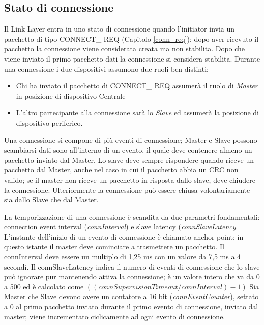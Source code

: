 \subsection{Stato di connessione}\label{connState}
Il Link Layer entra in uno stato di connessione quando l'initiator invia un pacchetto di tipo CONNECT\_ REQ (Capitolo \ref{conn_req}); dopo aver ricevuto il pacchetto la connessione viene considerata creata ma non stabilita. Dopo che viene inviato il primo pacchetto dati la connessione si considera stabilita.
Durante una connessione i due dispositivi assumono due ruoli ben distinti:
\begin{itemize}
\item Chi ha inviato il pacchetto di CONNECT\_ REQ assumerà il ruolo di \emph{Master} in posizione di dispositivo Centrale
\item L'altro partecipante alla connessione sarà lo \emph{Slave} ed assumerà la posizione di dispositivo periferico.
\end{itemize}
Una connessione si compone di più eventi di connessione; Master e Slave possono scambiarsi dati sono all'interno di un evento, il quale deve contenere almeno un pacchetto inviato dal Master. Lo slave deve sempre rispondere quando riceve un pacchetto dal Master, anche nel caso in cui il pacchetto abbia un CRC non valido; se il master non riceve un pacchetto in risposta dallo slave, deve chiudere la connessione. Ulteriormente la connessione può essere chiusa volontariamente sia dallo Slave che dal Master.


La temporizzazione di una connessione è scandita da due parametri fondamentali: connection event interval (\emph{connInterval}) e slave latency (\emph{connSlaveLatency}. L'instante dell'inizio di un evento di connessione è chiamato anchor point; in questo istante il master deve cominciare a trasmettere un pacchetto.
Il connInterval deve essere un multiplo di 1,25 ms con un valore da 7,5 ms a 4 secondi.
Il connSlaveLatency indica il numero di eventi di connessione che lo slave può ignorare pur mantenendo attiva la connessione; è un valore intero che va da 0 a 500 ed è calcolato come $((connSupervisionTimeout/connInterval) - 1)$
\linebreak
Sia Master che Slave devono avere un contatore a 16 bit (\emph{connEventCounter}), settato a 0 al primo pacchetto inviato durante il primo evento di connessione, inviato dal master; viene incrementato ciclicamente ad ogni evento di connessione.

